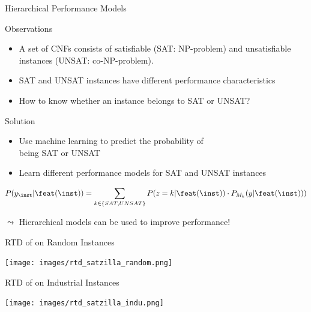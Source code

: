 \begin{frame}[c]{Hierarchical Performance Models}

\begin{block}{Observations}
\begin{itemize}
  \item A set of CNFs consists of satisfiable (SAT: NP-problem) and unsatisfiable instances (UNSAT: co-NP-problem).
  \item SAT and UNSAT instances have different performance characteristics
  \item How to know whether an instance belongs to SAT or UNSAT?
\end{itemize}
\end{block}

\pause

\begin{block}{Solution}
\begin{itemize}
  \item Use machine learning to predict the probability of\\ being SAT or UNSAT
  \item Learn different performance models for SAT and UNSAT instances
\end{itemize}

\begin{equation}
P(y_\inst|\feat(\inst)) = \sum_{k\in \{SAT,UNSAT\}} P(z=k | \feat(\inst)) \cdot P_{M_k} (y | \feat(\inst))) \nonumber
\end{equation}

\end{block}

$\leadsto$ \alert{Hierarchical models can be used to improve performance!}

\end{frame}
\begin{frame}[c]{RTD of \satzilla{} on Random Instances}

\centering
\texttt{[image: images/rtd\_satzilla\_random.png]}

\end{frame}
\begin{frame}[c]{RTD of \satzilla{} on Industrial Instances}

\centering
\texttt{[image: images/rtd\_satzilla\_indu.png]}

\end{frame}
